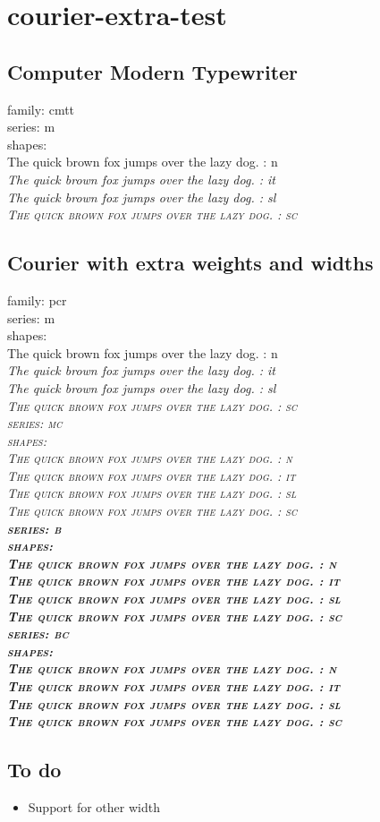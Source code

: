 \documentclass{article}
\newcommand{\quickbrownfox}{%
\textparagraph{} The quick brown fox jumps over the lazy dog.}
\newcommand{\shapes}{%
\bgroup
\upshape\quickbrownfox{} : n \\
\itshape\selectfont\quickbrownfox{} : it \\
\slshape\selectfont\quickbrownfox{} : sl \\
\scshape\selectfont\quickbrownfox{} : sc \\
\egroup}
\begin{document}
\section{courier-extra-test}

\subsection{Computer Modern Typewriter}

\normalfont
{}\selectfont
family: cmtt \\
series: m \\
shapes: \\
\shapes
\normalfont

\subsection{Courier with extra weights and widths}

\normalfont
{}\selectfont
family: pcr \\
%
\mdseries
series: m \\
shapes: \\
\shapes
%
\selectfont
series: mc \\
shapes: \\
\shapes
%
\bfseries
series: b \\
shapes: \\
\shapes
%
\selectfont
series: bc \\
shapes: \\
\shapes
\normalfont

\subsection{To do}
\begin{itemize}
  \item Support for other width
\end{itemize}
\end{document}
